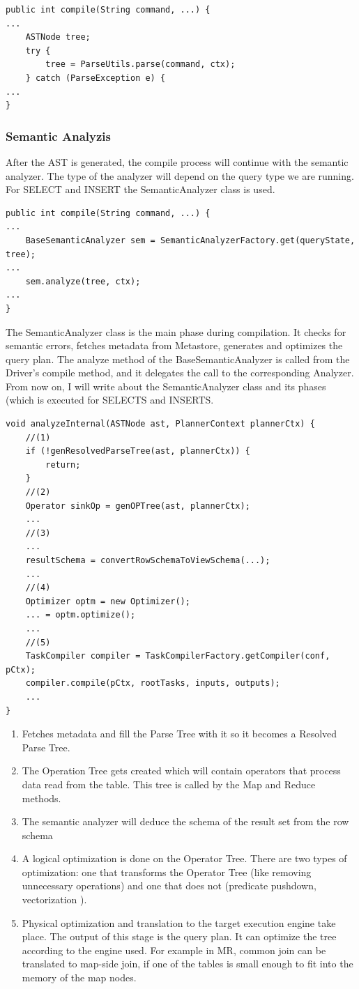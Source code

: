 \begin{lstlisting}
public int compile(String command, ...) {
...
	ASTNode tree;
	try {
		tree = ParseUtils.parse(command, ctx);
	} catch (ParseException e) {
...
}
\end{lstlisting}
\subsubsection{Semantic Analyzis}
After the AST is generated, the compile process will continue with the semantic analyzer. The type of the analyzer will depend on the query type we are running. For SELECT and INSERT the SemanticAnalyzer class is used. 

\begin{lstlisting}
public int compile(String command, ...) {
...
	BaseSemanticAnalyzer sem = SemanticAnalyzerFactory.get(queryState, tree);
...
	sem.analyze(tree, ctx);
...
}
\end{lstlisting}

The SemanticAnalyzer class is the main phase during compilation. It checks for semantic errors, fetches metadata from Metastore, generates and optimizes the query plan. The analyze method of the BaseSemanticAnalyzer is called from the Driver's compile method, and it delegates the call to the corresponding Analyzer. From now on, I will write about the SemanticAnalyzer class and its phases (which is executed for SELECTS and INSERTS.

\begin{lstlisting}
void analyzeInternal(ASTNode ast, PlannerContext plannerCtx) {
	//(1)
	if (!genResolvedParseTree(ast, plannerCtx)) {
		return;
	}
	//(2)
	Operator sinkOp = genOPTree(ast, plannerCtx);
	...
	//(3)
	...
	resultSchema = convertRowSchemaToViewSchema(...);
	...
	//(4)
	Optimizer optm = new Optimizer();
	... = optm.optimize();
	...
	//(5)
	TaskCompiler compiler = TaskCompilerFactory.getCompiler(conf, pCtx);
	compiler.compile(pCtx, rootTasks, inputs, outputs);
	...
}
\end{lstlisting}

\begin{enumerate}
	\item Fetches metadata and fill the Parse Tree with it so it becomes a Resolved Parse Tree.
	\item The Operation Tree gets created which will contain operators that process data read from the table. This tree is called by the Map and Reduce methods.
	\item The semantic analyzer will deduce the schema of the result set from the row schema
	\item A logical optimization is done on the Operator Tree. There are two types of optimization: one that transforms the Operator Tree (like removing unnecessary operations) and one that does not (predicate pushdown, vectorization \etc).
	\item Physical optimization and translation to the target execution engine take place. The output of this stage is the query plan. It can optimize the tree according to the engine used. For example in MR, common join can be translated to map-side join, if one of the tables is small enough to fit into the memory of the map nodes.
\end{enumerate}

